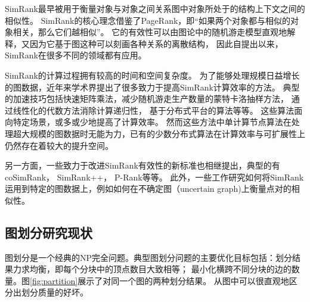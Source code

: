 \documentclass[master]{njuthesis}
\begin{document}
SimRank\cite{jeh2002simrank}最早被用于衡量对象与对象之间关系图中对象所处于的结构上下文之间的相似性。
SimRank的核心理念借鉴了PageRank\cite{page1999pagerank}，即“如果两个对象都与相似的对象相关，那么它们越相似”。
它的有效性可以由图论中的随机游走模型直观地解释，又因为它基于图这种可以刻画各种关系的离散结构，
因此自提出以来，SimRank在很多不同的领域都有应用。

SimRank的计算过程拥有较高的时间和空间复杂度。
为了能够处理规模日益增长的图数据，近年来学术界提出了很多致力于提高SimRank计算效率的方法。
典型的加速技巧包括快速矩阵乘法\cite{yu2012space}，减少随机游走生产数量的蒙特卡洛抽样方法\cite{kusumoto2014scalable}，
通过线性化的代数方法消除计算递归性\cite{DBLP:journals/corr/MaeharaKK14}，
基于分布式平台的算法\cite{cao2012delta}等等。
这些算法面向特定场景，或多或少地提高了计算效率。
然而这些方法中单计算节点算法在处理超大规模的图数据时无能为力，已有的少数分布式算法在计算效率与可扩展性上仍然存在着较大的提升空间。

另一方面，一些致力于改进SimRank有效性的新标准也相继提出，典型的有coSimRank\cite{DBLP:conf/acl/RotheS14}，
SimRank++\cite{DBLP:journals/pvldb/AntonellisGC08}，
P-Rank\cite{DBLP:conf/cikm/ZhaoHS09}等等。
此外，一些工作研究如何将SimRank运用到特定的图数据上，例如如何在不确定图\cite{DBLP:conf/icde/ZhuZL16}（uncertain graph)上衡量点对的相似性。

\subsection{图划分研究现状}
图划分是一个经典的NP完全问题。典型图划分问题的主要优化目标包括：划分结果力求均衡，即每个分块中的顶点数目大致相等；
最小化横跨不同分块的边的数量。图\ref{fig:partition}展示了对同一个图的两种划分结果。
从图中可以很直观地区分出划分质量的好坏。
\end{document}
